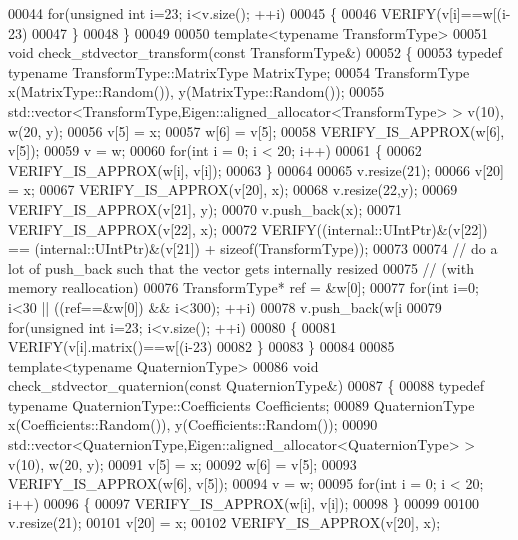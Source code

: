 \begin{DoxyCode}
00044   \textcolor{keywordflow}{for}(\textcolor{keywordtype}{unsigned} \textcolor{keywordtype}{int} i=23; i<v.size(); ++i)
00045   \{
00046     VERIFY(v[i]==w[(i-23)%
00047   \}
00048 \}
00049 
00050 \textcolor{keyword}{template}<\textcolor{keyword}{typename} TransformType>
00051 \textcolor{keywordtype}{void} check\_stdvector\_transform(\textcolor{keyword}{const} TransformType&)
00052 \{
00053   \textcolor{keyword}{typedef} \textcolor{keyword}{typename} TransformType::MatrixType MatrixType;
00054   TransformType x(MatrixType::Random()), y(MatrixType::Random());
00055   std::vector<TransformType,Eigen::aligned\_allocator<TransformType> > v(10), w(20, y);
00056   v[5] = x;
00057   w[6] = v[5];
00058   VERIFY\_IS\_APPROX(w[6], v[5]);
00059   v = w;
00060   \textcolor{keywordflow}{for}(\textcolor{keywordtype}{int} i = 0; i < 20; i++)
00061   \{
00062     VERIFY\_IS\_APPROX(w[i], v[i]);
00063   \}
00064 
00065   v.resize(21);
00066   v[20] = x;
00067   VERIFY\_IS\_APPROX(v[20], x);
00068   v.resize(22,y);
00069   VERIFY\_IS\_APPROX(v[21], y);
00070   v.push\_back(x);
00071   VERIFY\_IS\_APPROX(v[22], x);
00072   VERIFY((internal::UIntPtr)&(v[22]) == (internal::UIntPtr)&(v[21]) + \textcolor{keyword}{sizeof}(TransformType));
00073 
00074   \textcolor{comment}{// do a lot of push\_back such that the vector gets internally resized}
00075   \textcolor{comment}{// (with memory reallocation)}
00076   TransformType* ref = &w[0];
00077   \textcolor{keywordflow}{for}(\textcolor{keywordtype}{int} i=0; i<30 || ((ref==&w[0]) && i<300); ++i)
00078     v.push\_back(w[i%
00079   \textcolor{keywordflow}{for}(\textcolor{keywordtype}{unsigned} \textcolor{keywordtype}{int} i=23; i<v.size(); ++i)
00080   \{
00081     VERIFY(v[i].matrix()==w[(i-23)%
00082   \}
00083 \}
00084 
00085 \textcolor{keyword}{template}<\textcolor{keyword}{typename} QuaternionType>
00086 \textcolor{keywordtype}{void} check\_stdvector\_quaternion(\textcolor{keyword}{const} QuaternionType&)
00087 \{
00088   \textcolor{keyword}{typedef} \textcolor{keyword}{typename} QuaternionType::Coefficients Coefficients;
00089   QuaternionType x(Coefficients::Random()), y(Coefficients::Random());
00090   std::vector<QuaternionType,Eigen::aligned\_allocator<QuaternionType> > v(10), w(20, y);
00091   v[5] = x;
00092   w[6] = v[5];
00093   VERIFY\_IS\_APPROX(w[6], v[5]);
00094   v = w;
00095   \textcolor{keywordflow}{for}(\textcolor{keywordtype}{int} i = 0; i < 20; i++)
00096   \{
00097     VERIFY\_IS\_APPROX(w[i], v[i]);
00098   \}
00099 
00100   v.resize(21);
00101   v[20] = x;
00102   VERIFY\_IS\_APPROX(v[20], x);

\end{DoxyCode}
